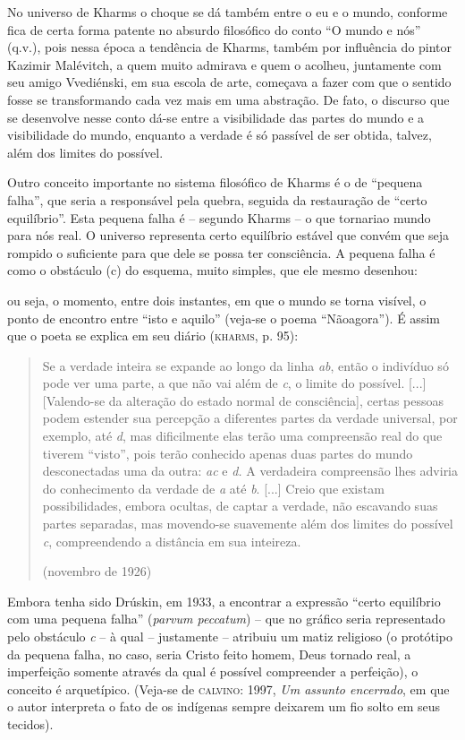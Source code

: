 No universo de Kharms o choque se dá também entre o eu e o mundo,
conforme fica de certa forma patente no absurdo filosófico do conto ``O
mundo e nós'' (q.v.), pois nessa época a tendência de Kharms, também por
influência do pintor Kazimir Malévitch, a quem muito admirava e quem o
acolheu, juntamente com seu amigo Vvediénski, em sua escola de arte,
começava a fazer com que o sentido fosse se transformando cada vez mais
em uma abstração. De fato, o discurso que se desenvolve nesse conto
dá-se entre a visibilidade das partes do mundo e a visibilidade do
mundo, enquanto a verdade é só passível de ser obtida, talvez, além dos
limites do possível.

Outro conceito importante no sistema filosófico de Kharms é o de
``pequena falha'', que seria a responsável pela quebra, seguida da
restauração de ``certo equilíbrio''. Esta pequena falha é -- segundo
Kharms -- o que tornariao mundo para nós real. O universo representa
certo equilíbrio estável que convém que seja rompido o suficiente para
que dele se possa ter consciência. A pequena falha é como o obstáculo
(c) do esquema, muito simples, que ele mesmo desenhou:

ou seja, o momento, entre dois instantes, em que o mundo se torna
visível, o ponto de encontro entre ``isto e aquilo'' (veja-se o poema
``Nãoagora''). É assim que o poeta se explica em seu diário
(\textsc{kharms}, p. 95):

\begin{quote}
Se a verdade inteira se expande ao longo da linha \emph{ab}, então o
indivíduo só pode ver uma parte, a que não vai além de \emph{c}, o
limite do possível. {[}...{]} {[}Valendo-se da alteração do estado
normal de consciência{]}, certas pessoas podem estender sua percepção a
diferentes partes da verdade universal, por exemplo, até \emph{d}, mas
dificilmente elas terão uma compreensão real do que tiverem ``visto'',
pois terão conhecido apenas duas partes do mundo desconectadas uma da
outra: \emph{ac} e \emph{d.} A verdadeira compreensão lhes adviria do
conhecimento da verdade de \emph{a} até \emph{b}. {[}...{]} Creio que
existam possibilidades, embora ocultas, de captar a verdade, não
escavando suas partes separadas, mas movendo-se suavemente além dos
limites do possível \emph{c}, compreendendo a distância em sua
inteireza.

(novembro de 1926)
\end{quote}

Embora tenha sido Drúskin, em 1933, a encontrar a expressão ``certo
equilíbrio com uma pequena falha'' (\emph{parvum peccatum}) -- que no
gráfico seria representado pelo obstáculo \emph{c} -- à qual --
justamente -- atribuiu um matiz religioso (o protótipo da pequena falha,
no caso, seria Cristo feito homem, Deus tornado real, a imperfeição
somente através da qual é possível compreender a perfeição), o conceito
é arquetípico. (Veja-se de \textsc{calvino}: 1997, \emph{Um assunto
encerrado}, em que o autor interpreta o fato de os indígenas sempre
deixarem um fio solto em seus tecidos).

